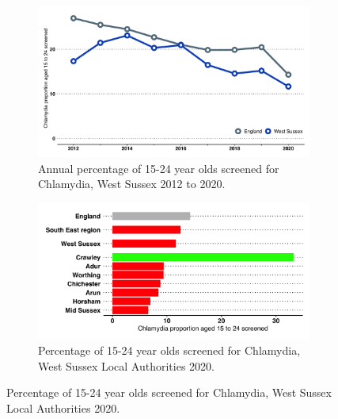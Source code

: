 \begin{figure}
    \caption{Percentage chlamydia screening over time and in West Sussex Local Authorities.}
    \label{figure:ct_screen_wsx}
    \centering
    \begin{subfigure}[b]{0.99\linewidth}
        \centering
        \caption{Annual percentage of 15-24 year olds screened  for Chlamydia, West Sussex 2012 to 2020.}\label{fig:chlamydia:p_u25_time}
        \includegraphics[width=\linewidth]{images/ct_screened_line.png}
    \end{subfigure}
    \begin{subfigure}[b]{0.99\linewidth}
        \centering
        \caption{Percentage of 15-24 year olds screened for Chlamydia, West Sussex Local Authorities 2020.}\label{fig:chlamydia:p_u25_dabs}        
        \includegraphics[width=\linewidth]{images/chlamydia_screen_yp_rag_bar.png}
    \end{subfigure}
    \vspace*{3mm}
\end{figure}




